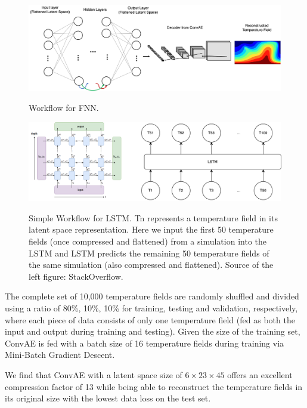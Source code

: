 \begin{figure}[H]
    \centering
    \caption{Workflow for FNN.}
    \includegraphics[scale=0.35]{figures/mantle_convection_images/FNN_workflow.png}
    \label{figure:FNN_workflow}
\end{figure}

\begin{figure}[H]
    \centering
    \caption{Simple Workflow for LSTM. Tn represents a temperature field in its latent space representation. Here we input the first 50 temperature fields (once compressed and flattened) from a simulation into the LSTM and LSTM  predicts the remaining 50 temperature fields of the same simulation (also compressed and flattened). Source of the left figure: StackOverflow.}
    \includegraphics[scale=0.6]{figures/mantle_convection_images/LSTM_workflow.png}
    \label{figure:LSTM_workflow}
\end{figure}

The complete set of 10,000 temperature fields are randomly shuffled and divided using a ratio of 80\%, 10\%, 10\% for training, testing and validation, respectively, where each piece of data consists of only one temperature field (fed as both the input and output during training and testing). Given the size of the training set, ConvAE is fed with a batch size of 16 temperature fields during training via Mini-Batch Gradient Descent.

We find that ConvAE with a latent space size of $6 \times 23 \times 45$ offers an excellent compression factor of 13 while being able to reconstruct the temperature fields in its original size with the lowest data loss on the test set.

